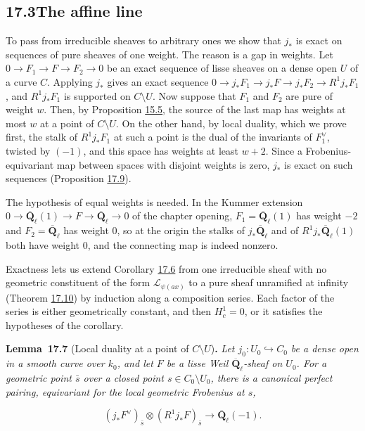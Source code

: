 \documentclass[11pt]{article}
\newenvironment{bpstatement}[2]{\par\addvspace{0.6\baselineskip}\noindent\textbf{#1}#2\textbf{.}\enspace\ignorespaces}
  {\par\addvspace{0.4\baselineskip}}
\newenvironment{bpstatementit}[2]{\begin{bpstatement}{#1}{#2}\itshape\ignorespaces}{\end{bpstatement}}
\begin{document}
\subsection*{\texorpdfstring{17.3\quad The affine line}{17.3 The affine line}}
\label{bp243}%
\label{bp244}%
To pass from irreducible sheaves to arbitrary ones we show that \(j_*\) is exact on sequences of pure sheaves of one weight. The reason is a gap in weights. Let \(0\to F_1\to F\to F_2\to0\) be an exact sequence of lisse sheaves on a dense open \(U\) of a curve \(C\). Applying \(j_*\) gives an exact sequence \(0\to j_*F_1\to j_*F\to j_*F_2\to R^1j_*F_1\), and \(R^1j_*F_1\) is supported on \(C\setminus U\). Now suppose that \(F_1\) and \(F_2\) are pure of weight \(w\). Then, by Proposition \hyperref[bp134]{15.5}, the source of the last map has weights at most \(w\) at a point of \(C\setminus U\). On the other hand, by local duality, which we prove first, the stalk of \(R^1j_*F_1\) at such a point is the dual of the invariants of \(F_1^\vee\), twisted by \((-1)\), and this space has weights at least \(w+2\). Since a Frobenius-equivariant map between spaces with disjoint weights is zero, \(j_*\) is exact on such sequences (Proposition \hyperref[bp249]{17.9}).

The hypothesis of equal weights is needed. In the Kummer extension \(0\to\overline{\mathbf Q}_\ell(1)\to F\to\overline{\mathbf Q}_\ell\to0\) of the chapter opening, \(F_1=\overline{\mathbf Q}_\ell(1)\) has weight \(-2\) and \(F_2=\overline{\mathbf Q}_\ell\) has weight \(0\), so at the origin the stalks of \(j_*\overline{\mathbf Q}_\ell\) and of \(R^1j_*\overline{\mathbf Q}_\ell(1)\) both have weight \(0\), and the connecting map is indeed nonzero.

Exactness lets us extend Corollary \hyperref[bp241]{17.6} from one irreducible sheaf with no geometric constituent of the form \(\mathcal L_{\psi(ax)}\) to a pure sheaf unramified at infinity (Theorem \hyperref[bp252]{17.10}) by induction along a composition series. Each factor of the series is either geometrically constant, and then \(H^1_c=0\), or it satisfies the hypotheses of the corollary.

\label{bp245}%
\begin{bpstatementit}{Lemma~17.7}{ (Local duality at a point of $C\setminus U$)}
Let \(j_0:U_0\hookrightarrow C_0\) be a dense open in a smooth curve over \(k_0\), and let \(F\) be a lisse Weil \(\overline{\mathbf Q}_\ell\)-sheaf on \(U_0\). For a geometric point \(\bar s\) over a closed point \(s\in C_0\setminus U_0\), there is a canonical perfect pairing, equivariant for the local geometric Frobenius at \(s\),

\[
(j_*F^\vee)_{\bar s}\otimes(R^1j_*F)_{\bar s}
\longrightarrow\overline{\mathbf Q}_\ell(-1).
\]
\end{bpstatementit}
\end{document}
